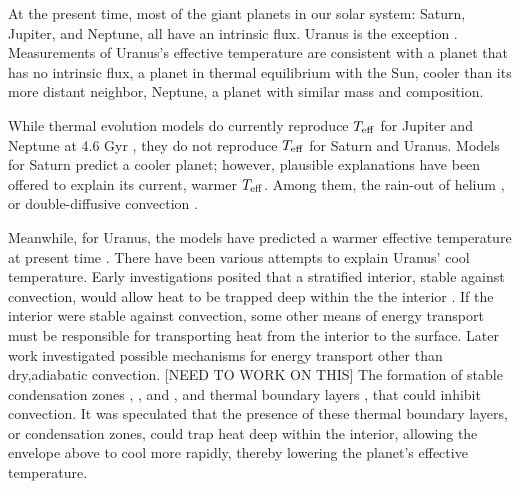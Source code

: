 \documentclass[11pt]{ucscthesisbs}
\begin{document}
At the present time, most of the giant planets in our solar system: Saturn, Jupiter, and Neptune, all have an intrinsic flux. Uranus is the exception \citep{pearl_conrath_1991}. Measurements of Uranus's effective temperature are consistent with a planet that has no intrinsic flux, a planet in thermal equilibrium with the Sun, cooler than its more distant neighbor, Neptune, a planet with similar mass and composition. 

While thermal evolution models do currently reproduce $T_{\rm eff}$ for Jupiter and Neptune at 4.6 Gyr \citep{graboske_1975,fortney_2011}, they do not reproduce $T_{\rm eff}$ for Saturn and Uranus. Models for Saturn predict a cooler planet; however, plausible explanations have been offered to explain its current, warmer $T_{\rm eff}$. Among them, the rain-out of helium \citep{fortney_hubbard_2003, mankovich_2020}, or double-diffusive convection \citep{leconte_chabrier_2013}. 

Meanwhile, for Uranus, the models have predicted a warmer effective temperature at present time \citep{fortney_2011, podolak_1991, hubbard_1995, scheibe_2019}. There have been various attempts to explain Uranus' cool temperature. Early investigations posited that a stratified interior, stable against convection, would allow heat to be trapped deep within the the interior \citep{podolak_1991}. If the interior were stable against convection, some other means of energy transport must be responsible for transporting heat from the interior to the surface. Later work investigated possible mechanisms for energy transport other than dry,adiabatic convection. [NEED TO WORK ON THIS] The formation of stable condensation zones \citep{friedson_2017}, \citep{leconte_2017}, and \citep{guillot_1995}, and thermal boundary layers \citep{nettelmann_2016}, that could inhibit convection. It was speculated that the presence of these thermal boundary layers, or condensation zones, could trap heat deep within the interior, allowing the envelope above to cool more rapidly, thereby lowering the planet's effective temperature.
\end{document}
